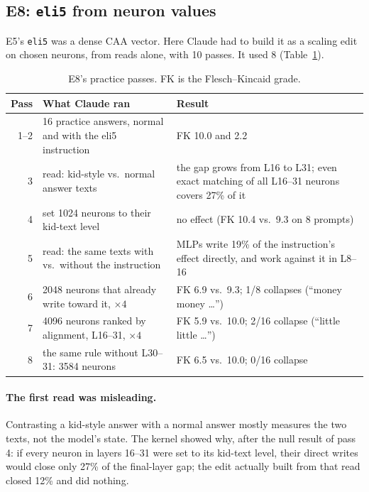 \subsection{E8: \texttt{eli5} from neuron values}
\label{sec:e8}
E5's \texttt{eli5} was a dense CAA vector. Here Claude had to build it as a scaling edit on chosen neurons, from reads alone, with 10 passes. It used 8 (Table~\ref{tab:e8}).

\begin{table}[t]\centering\small
\begin{tabular}{rp{6.2cm}p{5.6cm}}\toprule
Pass & What Claude ran & Result\\\midrule
1--2 & 16 practice answers, normal and with the eli5 instruction & FK 10.0 and 2.2\\
3 & read: kid-style vs.\ normal answer texts & the gap grows from L16 to L31; even exact matching of all L16--31 neurons covers 27\% of it\\
4 & set 1024 neurons to their kid-text level & no effect (FK 10.4 vs.\ 9.3 on 8 prompts)\\
5 & read: the same texts with vs.\ without the instruction & MLPs write 19\% of the instruction's effect directly, and work against it in L8--16\\
6 & 2048 neurons that already write toward it, $\times4$ & FK 6.9 vs.\ 9.3; 1/8 collapses (``money money \dots'')\\
7 & 4096 neurons ranked by alignment, L16--31, $\times4$ & FK 5.9 vs.\ 10.0; 2/16 collapse (``little little \dots'')\\
8 & the same rule without L30--31: 3584 neurons & FK 6.5 vs.\ 10.0; 0/16 collapse\\\bottomrule
\end{tabular}
\caption{E8's practice passes. FK is the Flesch--Kincaid grade.}
\label{tab:e8}
\end{table}

\paragraph{The first read was misleading.}
Contrasting a kid-style answer with a normal answer mostly measures the two texts, not the model's state. The kernel showed why, after the null result of pass 4: if every neuron in layers 16--31 were set to its kid-text level, their direct writes would close only 27\% of the final-layer gap; the edit actually built from that read closed 12\% and did nothing.

